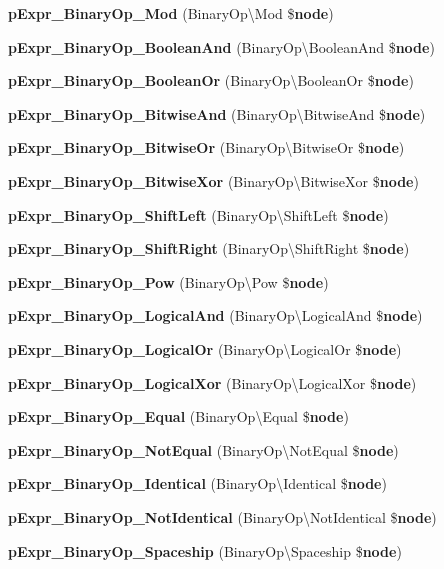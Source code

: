 \begin{DoxyCompactItemize}
\item 
{\bf p\+Expr\+\_\+\+Binary\+Op\+\_\+\+Mod} (Binary\+Op\textbackslash{}\+Mod \${\bf node})
\item 
{\bf p\+Expr\+\_\+\+Binary\+Op\+\_\+\+Boolean\+And} (Binary\+Op\textbackslash{}\+Boolean\+And \${\bf node})
\item 
{\bf p\+Expr\+\_\+\+Binary\+Op\+\_\+\+Boolean\+Or} (Binary\+Op\textbackslash{}\+Boolean\+Or \${\bf node})
\item 
{\bf p\+Expr\+\_\+\+Binary\+Op\+\_\+\+Bitwise\+And} (Binary\+Op\textbackslash{}\+Bitwise\+And \${\bf node})
\item 
{\bf p\+Expr\+\_\+\+Binary\+Op\+\_\+\+Bitwise\+Or} (Binary\+Op\textbackslash{}\+Bitwise\+Or \${\bf node})
\item 
{\bf p\+Expr\+\_\+\+Binary\+Op\+\_\+\+Bitwise\+Xor} (Binary\+Op\textbackslash{}\+Bitwise\+Xor \${\bf node})
\item 
{\bf p\+Expr\+\_\+\+Binary\+Op\+\_\+\+Shift\+Left} (Binary\+Op\textbackslash{}\+Shift\+Left \${\bf node})
\item 
{\bf p\+Expr\+\_\+\+Binary\+Op\+\_\+\+Shift\+Right} (Binary\+Op\textbackslash{}\+Shift\+Right \${\bf node})
\item 
{\bf p\+Expr\+\_\+\+Binary\+Op\+\_\+\+Pow} (Binary\+Op\textbackslash{}\+Pow \${\bf node})
\item 
{\bf p\+Expr\+\_\+\+Binary\+Op\+\_\+\+Logical\+And} (Binary\+Op\textbackslash{}\+Logical\+And \${\bf node})
\item 
{\bf p\+Expr\+\_\+\+Binary\+Op\+\_\+\+Logical\+Or} (Binary\+Op\textbackslash{}\+Logical\+Or \${\bf node})
\item 
{\bf p\+Expr\+\_\+\+Binary\+Op\+\_\+\+Logical\+Xor} (Binary\+Op\textbackslash{}\+Logical\+Xor \${\bf node})
\item 
{\bf p\+Expr\+\_\+\+Binary\+Op\+\_\+\+Equal} (Binary\+Op\textbackslash{}\+Equal \${\bf node})
\item 
{\bf p\+Expr\+\_\+\+Binary\+Op\+\_\+\+Not\+Equal} (Binary\+Op\textbackslash{}\+Not\+Equal \${\bf node})
\item 
{\bf p\+Expr\+\_\+\+Binary\+Op\+\_\+\+Identical} (Binary\+Op\textbackslash{}\+Identical \${\bf node})
\item 
{\bf p\+Expr\+\_\+\+Binary\+Op\+\_\+\+Not\+Identical} (Binary\+Op\textbackslash{}\+Not\+Identical \${\bf node})
\item 
{\bf p\+Expr\+\_\+\+Binary\+Op\+\_\+\+Spaceship} (Binary\+Op\textbackslash{}\+Spaceship \${\bf node})
\item 

\end{DoxyCompactItemize}

